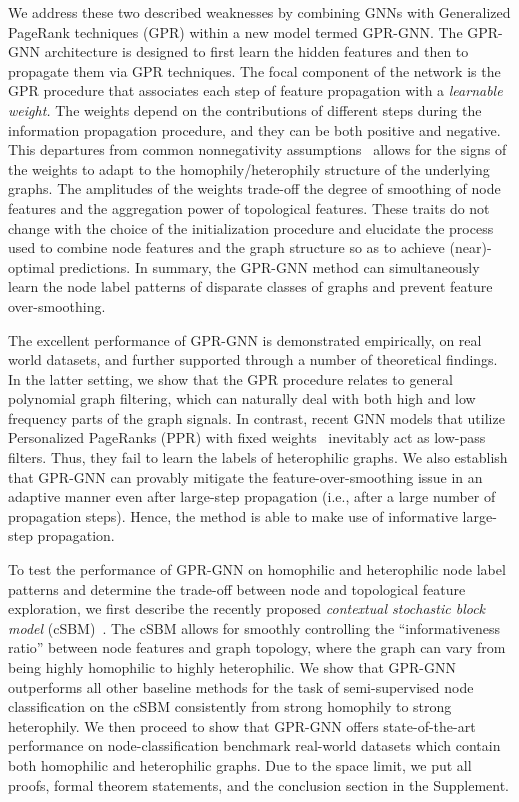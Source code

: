 \documentclass{article} \usepackage{iclr2021_conference,times}
\begin{document}
We address these two described weaknesses by combining GNNs with Generalized PageRank techniques (GPR) within a new model termed GPR-GNN. The GPR-GNN architecture is designed to first learn the hidden features and then to propagate them via GPR techniques. The focal component of the network is the GPR procedure that associates each step of feature propagation with a \emph{learnable weight.} The weights depend on the contributions of different steps during the information propagation procedure, and they can be both positive and negative. This departures from common nonnegativity assumptions~\citep{klicpera2018predict} allows for the signs of the weights to adapt to the homophily/heterophily structure of the underlying graphs. The amplitudes of the weights trade-off the degree of smoothing of node features and the aggregation power of topological features. These traits do not change with the choice of the initialization procedure and elucidate the process used to combine node features and the graph structure so as to achieve (near)-optimal predictions. In summary, the GPR-GNN method can simultaneously learn the node label patterns of disparate classes of graphs and prevent feature over-smoothing.


The excellent performance of GPR-GNN is demonstrated empirically, on real world datasets, and further supported through a number of theoretical findings. In the latter setting, we show that the GPR procedure relates to general polynomial graph filtering, which can naturally deal with both high and low frequency parts of the graph signals. In contrast, recent GNN models that utilize Personalized PageRanks (PPR) with fixed weights~\citep{wu2019simplifying,klicpera2018predict,klicpera2019diffusion} inevitably act as low-pass filters. Thus, they fail to learn the labels of heterophilic graphs. We also establish that GPR-GNN can provably mitigate the feature-over-smoothing issue in an adaptive manner even after large-step propagation (i.e., after a large number of propagation steps). Hence, the method is able to make use of informative large-step propagation.


To test the performance of GPR-GNN on homophilic and heterophilic node label patterns and determine the trade-off between node and topological feature exploration, we first describe the recently proposed \emph{contextual stochastic block model} (cSBM)~\citep{deshpande2018contextual}. The cSBM allows for smoothly controlling the ``informativeness ratio'' between node features and graph topology, where the graph can vary from being highly homophilic to highly heterophilic. We show that GPR-GNN outperforms all other baseline methods for the task of semi-supervised node classification on the cSBM consistently from strong homophily to strong heterophily. We then proceed to show that GPR-GNN offers state-of-the-art performance on node-classification benchmark real-world datasets which contain both homophilic and heterophilic graphs. Due to the space limit, we put all proofs, formal theorem statements, and the conclusion section in the Supplement.
\end{document}
